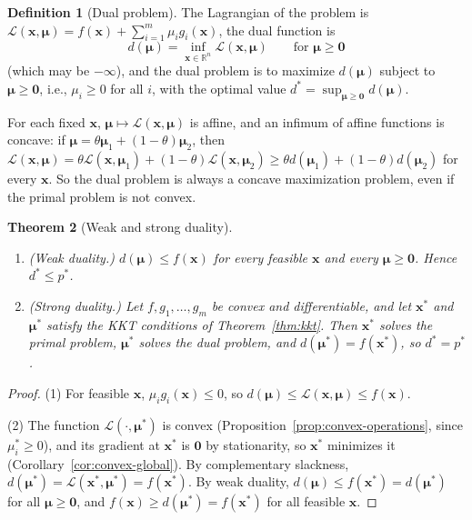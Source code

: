 \documentclass[11pt]{article}
\theoremstyle{definition}
\newtheorem{definition}{Definition}[section]
\theoremstyle{plain}
\newtheorem{theorem}[definition]{Theorem}
\theoremstyle{remark}
\begin{document}
\begin{definition}[Dual problem]\label{def:dual}
    The Lagrangian of the problem is $\mathcal{L}(\mathbf{x}, \boldsymbol{\mu}) = f(\mathbf{x}) + \sum_{i=1}^m \mu_ig_i(\mathbf{x})$, the dual function is
    \[d(\boldsymbol{\mu}) = \inf_{\mathbf{x} \in \mathbb{R}^n} \mathcal{L}(\mathbf{x}, \boldsymbol{\mu}) \qquad \text{for } \boldsymbol{\mu} \geq \mathbf{0}\]
    (which may be $-\infty$), and the dual problem is to maximize $d(\boldsymbol{\mu})$ subject to $\boldsymbol{\mu} \geq \mathbf{0}$, i.e., $\mu_i \geq 0$ for all $i$, with the optimal value $d^* = \sup_{\boldsymbol{\mu} \geq \mathbf{0}} d(\boldsymbol{\mu})$.
\end{definition}

For each fixed $\mathbf{x}$, $\boldsymbol{\mu} \mapsto \mathcal{L}(\mathbf{x}, \boldsymbol{\mu})$ is affine, and an infimum of affine functions is concave: if $\boldsymbol{\mu} = \theta\boldsymbol{\mu}_1 + (1 - \theta)\boldsymbol{\mu}_2$, then $\mathcal{L}(\mathbf{x}, \boldsymbol{\mu}) = \theta\mathcal{L}(\mathbf{x}, \boldsymbol{\mu}_1) + (1 - \theta)\mathcal{L}(\mathbf{x}, \boldsymbol{\mu}_2) \geq \theta d(\boldsymbol{\mu}_1) + (1 - \theta)d(\boldsymbol{\mu}_2)$ for every $\mathbf{x}$. So the dual problem is always a concave maximization problem, even if the primal problem is not convex.

\begin{theorem}[Weak and strong duality]\label{thm:duality}
    \begin{enumerate}
        \item (Weak duality.) $d(\boldsymbol{\mu}) \leq f(\mathbf{x})$ for every feasible $\mathbf{x}$ and every $\boldsymbol{\mu} \geq \mathbf{0}$. Hence $d^* \leq p^*$.
        \item (Strong duality.) Let $f, g_1, \ldots, g_m$ be convex and differentiable, and let $\mathbf{x}^*$ and $\boldsymbol{\mu}^*$ satisfy the KKT conditions of Theorem~\ref{thm:kkt}. Then $\mathbf{x}^*$ solves the primal problem, $\boldsymbol{\mu}^*$ solves the dual problem, and $d(\boldsymbol{\mu}^*) = f(\mathbf{x}^*)$, so $d^* = p^*$.
    \end{enumerate}
\end{theorem}

\begin{proof}
    (1) For feasible $\mathbf{x}$, $\mu_ig_i(\mathbf{x}) \leq 0$, so $d(\boldsymbol{\mu}) \leq \mathcal{L}(\mathbf{x}, \boldsymbol{\mu}) \leq f(\mathbf{x})$.

    (2) The function $\mathcal{L}(\cdot, \boldsymbol{\mu}^*)$ is convex (Proposition~\ref{prop:convex-operations}, since $\mu_i^* \geq 0$), and its gradient at $\mathbf{x}^*$ is $\mathbf{0}$ by stationarity, so $\mathbf{x}^*$ minimizes it (Corollary~\ref{cor:convex-global}). By complementary slackness, $d(\boldsymbol{\mu}^*) = \mathcal{L}(\mathbf{x}^*, \boldsymbol{\mu}^*) = f(\mathbf{x}^*)$. By weak duality, $d(\boldsymbol{\mu}) \leq f(\mathbf{x}^*) = d(\boldsymbol{\mu}^*)$ for all $\boldsymbol{\mu} \geq \mathbf{0}$, and $f(\mathbf{x}) \geq d(\boldsymbol{\mu}^*) = f(\mathbf{x}^*)$ for all feasible $\mathbf{x}$.
\end{proof}
\end{document}
